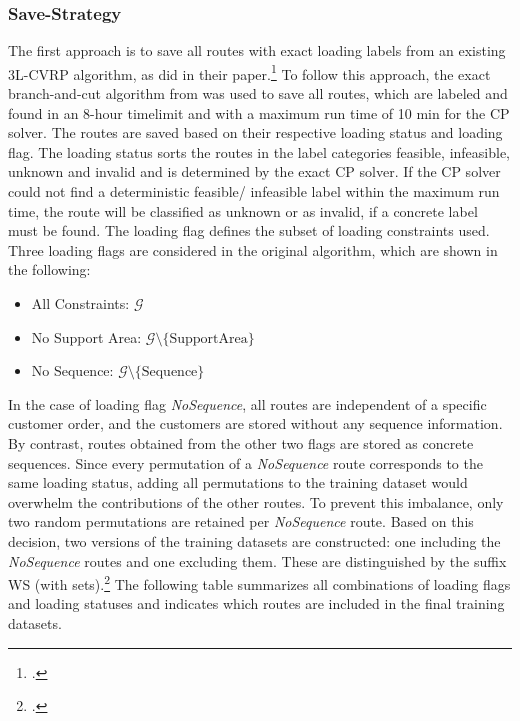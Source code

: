 \subsubsection{Save-Strategy}
The first approach is to save all routes with exact loading labels from an existing \gls{3L-CVRP}
algorithm, as \cite{zhang_learning-based_2022} did in their paper.\footcite[cf.][]{zhang_learning-based_2022}
To follow this approach, the exact branch-and-cut algorithm from \cite{tamke_branch-and-cut_2024} was
used to save all routes, which are labeled and found in an 8-hour timelimit and with a maximum run time of 10 min for the \gls{CP} solver.
The routes are saved based on their respective loading status and loading flag. The loading status sorts the routes in the
label categories feasible, infeasible, unknown and invalid and is determined by the exact \gls{CP} solver.
If the \gls{CP} solver could not find a deterministic feasible/ infeasible label within the maximum run time, the route
will be classified as unknown or as invalid, if a concrete label must be found. The loading flag defines the subset of
loading constraints used. Three loading flags are considered in the original algorithm, which are shown
in the following:
\begin{itemize}
	\item All Constraints: $\mathcal{G}$
	\item No Support Area: $\mathcal{G}\setminus \{\text{SupportArea}\}$
	\item No Sequence: $\mathcal{G}\setminus \{\text{Sequence}\}$
\end{itemize}
In the case of loading flag \textit{NoSequence}, all routes are independent of a specific customer order, and the customers are stored
without any sequence information. By contrast, routes obtained from the other two flags are stored as concrete sequences.
Since every permutation of a \textit{NoSequence} route corresponds to the same loading status, adding all permutations to the training
dataset would overwhelm the contributions of the other routes. To prevent this imbalance, only two random permutations are
retained per \textit{NoSequence} route. Based on this decision, two versions of the training datasets are constructed:
one including the \textit{NoSequence} routes and one excluding them. These are distinguished by the suffix WS (with sets).\footcites[Retrieved from][]{tamke_repository_2024}[cf.][]{tamke_branch-and-cut_2024}
The following table summarizes all combinations of loading flags and loading statuses and indicates which routes are included in
the final training datasets.

